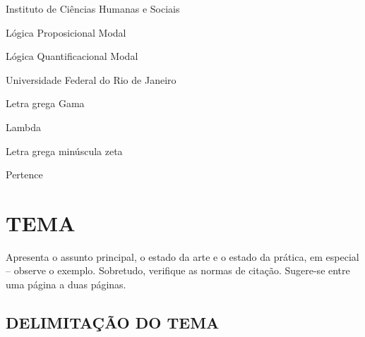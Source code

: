 \documentclass[
	12pt,				%
	openright,			%
	oneside,			%
	a4paper,			%
	chapter=TITLE,		%
	english,			%
	french,				%
	spanish,			%
	brazil				%
	]{abntex2}
\begin{document}
\listoffigures*
\cleardoublepage

\listoftables*
\cleardoublepage

\begin{siglas} 
	\item[ICHS] Instituto de Ciências Humanas e Sociais 
	\item[LPM] Lógica Proposicional Modal 
	\item[LQM] Lógica Quantificacional Modal 
	\item[UFRJ] Universidade Federal do Rio de Janeiro
\end{siglas}

\begin{simbolos}
	\item[$ \Gamma $] Letra grega Gama
	\item[$ \Lambda $] Lambda
	\item[$ \zeta $] Letra grega minúscula zeta
	\item[$ \in $] Pertence
\end{simbolos}


\tableofcontents*
\cleardoublepage




\textual 

\chapter{\textbf{TEMA}} %

Apresenta o assunto principal, o estado da arte e o estado da prática, em especial – observe o exemplo. Sobretudo, verifique as normas de citação. Sugere-se entre uma página a duas páginas.

\section[DELIMITAÇÃO DO TEMA]{DELIMITAÇÃO DO TEMA}
\end{document}
